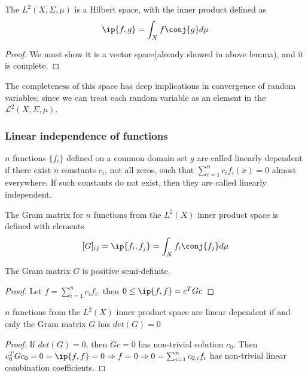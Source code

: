 \begin{refsection}
\begin{theorem}\label{ch:functional-analysis:th:SquareLebegueIntegrableFunctionSpaceIsHilbertSpace}
	\cite[397]{johnsonbaugh2010foundations} The $L^2(X,\Sigma,\mu)$ is a Hilbert space, with the inner product defined as
	$$\ip{f,g} = \int_X f\conj{g} d\mu$$
\end{theorem}
\begin{proof}
	We must show it is a vector space(already showed in above lemma), and it is complete. 	
\end{proof}


\begin{remark}
	The completeness of this space has deep implications in convergence of random variables, since we can treat each random variable as an element in the $\mathcal{L}^2(X,\Sigma,\mu)$.
\end{remark}
\subsubsection{Linear independence of functions}
\begin{definition}
	\cite[2]{sansone2004orthogonal}  $n$ functions $\{f_i\}$ defined on a common domain set $g$ are called linearly dependent if there exist $n$ constants $c_i$, not all zeros, such that $\sum_{i=1}^n c_i f_i(x) = 0$ almost everywhere. If such constants do not exist, then they are called linearly independent.
\end{definition}


\begin{definition}
	The Gram matrix for $n$ functions from the $L^2(X)$ inner product space is defined with elements
	$$[G]_{ij} = \ip{f_i,f_j} = \int_X f_i\conj{f_j}d\mu$$
\end{definition}


\begin{lemma}
	The Gram matrix $G$ is positive semi-definite. 
\end{lemma}
\begin{proof}
	Let $f= \sum_{i=1}^n c_i f_i$, then $0\leq \ip{f,f} = c^T G c$	
\end{proof}



\begin{theorem}
	$n$ functions from the $L^2(X)$ inner product space are linear dependent if and only the Gram matrix $G$ has $det(G) = 0$
\end{theorem}
\begin{proof}
	If $det(G) = 0$, then $Gc = 0$ has non-trivial solution $c_0$. Then $c_0^T G c_0 = 0 =\ip{f,f} = 0\Rightarrow f = 0 \Rightarrow 0 = \sum_{i=1}^n c_{0,i} f_i$ has non-trivial linear combination coefficients. 	
\end{proof}





\end{refsection}
